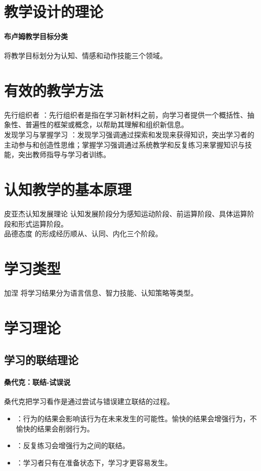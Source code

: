 \documentclass[b5paper,11pt]{article}
\begin{document}
\section{教学设计的理论}
\paragraph{布卢姆教学目标分类} 将教学目标划分为认知、情感和动作技能三个领域。

\section{有效的教学方法}
\noindent
\textcolor{ctp-peach}{先行组织者} ：先行组织者是指在学习新材料之前，向学习者提供一个概括性、抽象性、普遍性的框架或概念，以帮助其理解和组织新信息。 \\
\textcolor{ctp-peach}{发现学习与掌握学习} ：发现学习强调通过探索和发现来获得知识，突出学习者的主动参与和创造性思维；掌握学习强调通过系统教学和反复练习来掌握知识与技能，突出教师指导与学习者训练。

\section{认知教学的基本原理}
\noindent
\textcolor{ctp-peach}{皮亚杰认知发展理论} 认知发展阶段分为感知运动阶段、前运算阶段、具体运算阶段和形式运算阶段。\\
\textcolor{ctp-peach}{品德态度} 的形成经历顺从、认同、内化三个阶段。

\psplit

\section{学习类型}
\noindent
\textcolor{ctp-peach}{加涅} 将学习结果分为语言信息、智力技能、认知策略等类型。

\section{学习理论}
\subsection*{学习的联结理论}

\vspace{0.8em}

\noindent
\paragraph{桑代克：联结-试误说}
桑代克把学习看作是通过尝试与错误建立联结的过程。
\begin{itemize}
  \item {}：行为的结果会影响该行为在未来发生的可能性。愉快的结果会增强行为，不愉快的结果会削弱行为。
  \item {}：反复练习会增强行为之间的联结。
  \item {}：学习者只有在准备状态下，学习才更容易发生。
\end{itemize}
\end{document}
